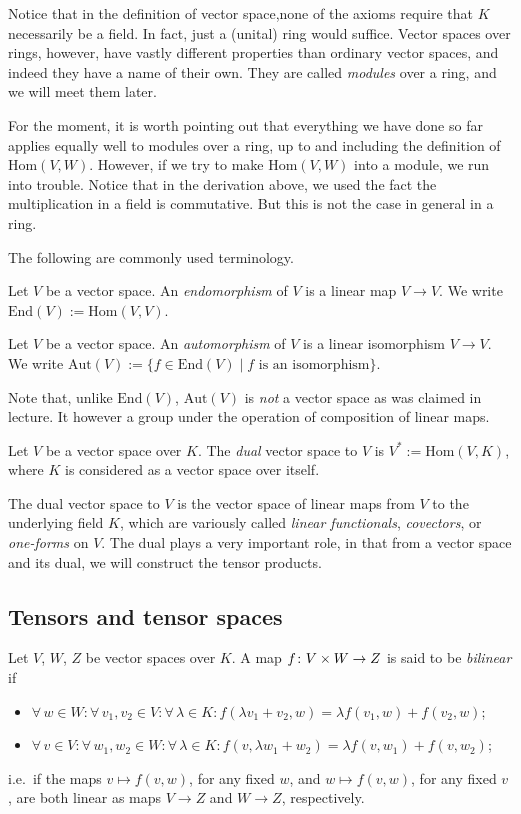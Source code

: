 \br
Notice that in the definition of vector space,none of the axioms require that $K$ necessarily be a field. In fact, just a (unital) ring would suffice. Vector spaces over rings, however, have vastly different properties than ordinary vector spaces, and indeed they have a name of their own. They are called \emph{modules} over a ring, and we will meet them later.

For the moment, it is worth pointing out that everything we have done so far applies equally well to modules over a ring, up to and including the definition of $\mathrm{Hom}(V,W)$. However, if we try to make $\mathrm{Hom}(V,W)$ into a module, we run into trouble. Notice that in the derivation above, we used the fact the multiplication in a field is commutative. But this is not the case in general in a ring.
\er

The following are commonly used terminology.

\bd
Let $V$ be a vector space. An \emph{endomorphism} of $V$ is a linear map $V\to V$. We write $\mathrm{End}(V):=\mathrm{Hom}(V,V)$.
\ed

\bd
Let $V$ be a vector space. An \emph{automorphism} of $V$ is a linear isomorphism $V\to V$. We write $\mathrm{Aut}(V):=\{f \in \mathrm{End}(V) \mid f \text{ is an isomorphism}\}$.
\ed

\br
Note that, unlike $\mathrm{End}(V)$, $\mathrm{Aut}(V)$ is \emph{not} a vector space as was claimed in lecture. It however a group under the operation of composition of linear maps.
\er

\bd
Let $V$ be a vector space over $K$. The \emph{dual} vector space to $V$ is $V^*:=\mathrm{Hom}(V,K)$, where $K$ is considered as a vector space over itself.
\ed

The dual vector space to $V$ is the vector space of linear maps from $V$ to the underlying field $K$, which are variously called \emph{linear functionals}, \emph{covectors}, or \emph{one-forms} on $V$. The dual plays a very important role, in that from a vector space and its dual, we will construct the tensor products.

\subsection{Tensors and tensor spaces}

\bd
Let $V$, $W$, $Z$ be vector spaces over $K$. A map $f\colon V\times W \to Z$ is said to be \emph{bilinear} if
\begin{itemize}
\item $\forall \, w\in W:\forall \, v_1,v_2\in V: \forall \,\lambda \in K : f(\lambda v_1+v_2,w)=\lambda f(v_1,w)+f(v_2,w)$;
\item $\forall \, v\in V:\forall \, w_1,w_2\in W: \forall \,\lambda \in K : f(v,\lambda w_1+w_2)=\lambda f(v,w_1)+f(v,w_2)$;
\end{itemize}
i.e.\ if the maps $v\mapsto f(v,w)$, for any fixed $w$, and $w\mapsto f(v,w)$, for any fixed $v$, are both linear as maps $V\to Z$ and $W\to Z$, respectively.
\ed

